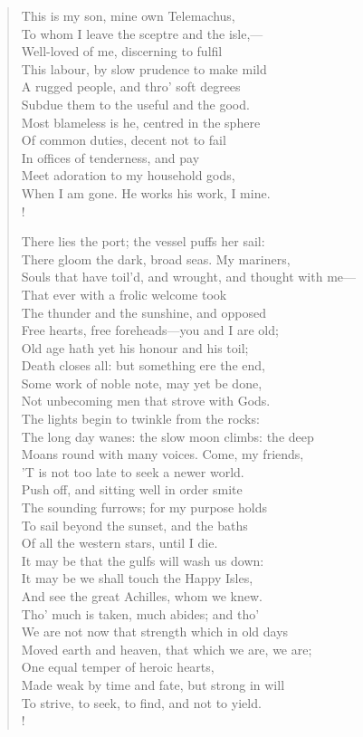 \documentclass[10pt]{memoir}
\begin{document}
\begin{verse}
\vin         This is my son, mine own Telemachus,\\
To whom I leave the sceptre and the isle,—\\
Well-loved of me, discerning to fulfil\\
This labour, by slow prudence to make mild\\
A rugged people, and thro' soft degrees\\
Subdue them to the useful and the good.\\
Most blameless is he, centred in the sphere\\
Of common duties, decent not to fail\\
In offices of tenderness, and pay\\
Meet adoration to my household gods,\\
When I am gone. He works his work, I mine.\\!

\vin         There lies the port; the vessel puffs her sail:\\
There gloom the dark, broad seas. My mariners,\\
Souls that have toil'd, and wrought, and thought with me—\\
That ever with a frolic welcome took\\
The thunder and the sunshine, and opposed\\
Free hearts, free foreheads—you and I are old;\\
Old age hath yet his honour and his toil;\\
Death closes all: but something ere the end,\\
Some work of noble note, may yet be done,\\
Not unbecoming men that strove with Gods.\\
The lights begin to twinkle from the rocks:\\
The long day wanes: the slow moon climbs: the deep\\
Moans round with many voices. Come, my friends,\\
'T is not too late to seek a newer world.\\
Push off, and sitting well in order smite\\
The sounding furrows; for my purpose holds\\
To sail beyond the sunset, and the baths\\
Of all the western stars, until I die.\\
It may be that the gulfs will wash us down:\\
It may be we shall touch the Happy Isles,\\
And see the great Achilles, whom we knew.\\
Tho' much is taken, much abides; and tho'\\
We are not now that strength which in old days\\
Moved earth and heaven, that which we are, we are;\\
One equal temper of heroic hearts,\\
Made weak by time and fate, but strong in will\\
To strive, to seek, to find, and not to yield.\\!


\end{verse}
\end{document}
